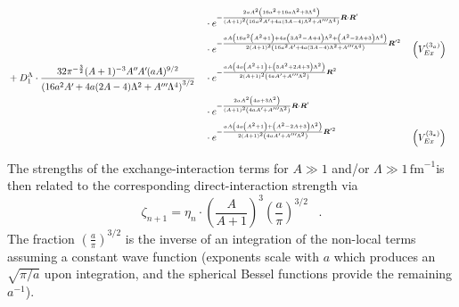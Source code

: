 \documentclass
[aps,nofootinbib,prl,showpacs,twocolumn,groupedaddress,superscriptaddress]
{revtex4}
\newcommand*{\mprime}{^{\prime}\mkern-1.2mu}
\newcommand*{\mdprime}{^{\prime\prime}\mkern-1.2mu}
\newcommand*{\mtprime}{^{\prime\prime\prime}\mkern-1.2mu}
\newcommand{\be}{\begin{equation}}
\newcommand{\ee}{\end{equation}}
\newcommand{\fm}{\ensuremath{\,\text{fm}^{-1}}}
\newcommand{\ve}[1]{\ensuremath{\boldsymbol{#1}}}
\begin{document}
\begin{widetext}
\begin{align*}
&&&\cdot e^{-\frac{2 a A^2 \left(16 a^2+16 a \Lambda ^2+3 \Lambda ^4\right)}{(A+1)^2 \left(16 a^2 A\mprime+4 a (3 A-4) \Lambda ^2+A\mtprime \Lambda ^4\right)}\ve{R}\cdot\ve{R}'}\\
&&&\cdot e^{-\frac{a A \left(16 a^2 \left(A^2+1\right)+4 a \left(3 A^2-A+4\right) \Lambda ^2+\left(A^2-2 A+3\right) \Lambda ^4\right)}{2 (A+1)^2 \left(16 a^2 A\mprime+4 a (3 A-4) \Lambda ^2+A\mtprime \Lambda ^4\right)}\ve{R}'^2}&&\left(V^{(3_a)}_{Ex}\right)\\
&+D_1^\Lambda\cdot
\frac{32 \pi^{-\frac{3}{2}} (A+1)^{-3} A\mdprime A\mprime (a A)^{9/2}}
{\left(16 a^2 A\mprime+4 a (2A-4) \Lambda ^2+A\mtprime \Lambda ^4\right)^{3/2}}
&&\cdot e^{-\frac{a A \left(4 a \left(A^2+1\right)+\left(5 A^2+2 A+3\right) \Lambda ^2\right)}{2 (A+1)^2 \left(4 a A\mprime+A\mtprime \Lambda ^2\right)}\ve{R}^2}\\
&&&\cdot e^{-\frac{2 a A^2 \left(4 a+3 \Lambda ^2\right)}{(A+1)^2 \left(4 a A\mprime+A\mtprime \Lambda ^2\right)}\ve{R}\cdot\ve{R}'}\\
&&&\cdot e^{-\frac{a A \left(4 a \left(A^2+1\right)+\left(A^2-2 A+3\right) \Lambda ^2\right)}{2 (A+1)^2 \left(4 a A\mprime+A\mtprime \Lambda ^2\right)}\ve{R}'^2}&&\left(V^{(3_*)}_{Ex}\right)\\
\end{align*}
\end{widetext}
%
The strengths of the exchange-interaction terms for $A\gg 1$ and/or $\Lambda\gg 1$\fm is then related to the corresponding
direct-interaction strength via
\be
\zeta_{n+1}=\eta_n\cdot\left(\frac{A}{A+1}\right)^3\left(\frac{a}{\pi}\right)^{3/2}\;\;\;.
\ee
The fraction $\left(\frac{a}{\pi}\right)^{3/2}$ is the inverse of an integration of the non-local
terms assuming a constant wave function (exponents scale with $a$ which produces an $\sqrt{\pi/a}$ upon integration,
and the spherical Bessel functions provide the remaining $a^{-1}$).
\end{document}
